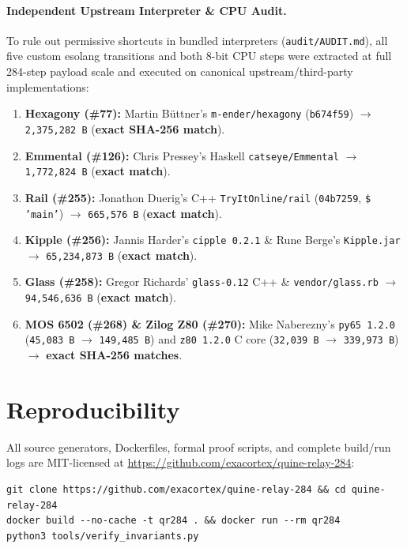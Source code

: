 \documentclass[10pt,twocolumn]{article}
\theoremstyle{definition}
\begin{document}
\paragraph{Independent Upstream Interpreter \& CPU Audit.}
To rule out permissive shortcuts in bundled interpreters (\texttt{audit/AUDIT.md}), all five custom esolang transitions and both 8-bit CPU steps were extracted at full 284-step payload scale and executed on canonical upstream/third-party implementations:
\begin{enumerate}
  \item \textbf{Hexagony (\#77):} Martin B\"uttner's \texttt{m-ender/hexagony} (\texttt{b674f59}) $\to$ \texttt{2,375,282\,B} (\textbf{exact SHA-256 match}).
  \item \textbf{Emmental (\#126):} Chris Pressey's Haskell \texttt{catseye/Emmental} $\to$ \texttt{1,772,824\,B} (\textbf{exact match}).
  \item \textbf{Rail (\#255):} Jonathon Duerig's C++ \texttt{TryItOnline/rail} (\texttt{04b7259}, \texttt{\$ 'main'}) $\to$ \texttt{665,576\,B} (\textbf{exact match}).
  \item \textbf{Kipple (\#256):} Jannis Harder's \texttt{cipple 0.2.1} \& Rune Berge's \texttt{Kipple.jar} $\to$ \texttt{65,234,873\,B} (\textbf{exact match}).
  \item \textbf{Glass (\#258):} Gregor Richards' \texttt{glass-0.12} C++ \& \texttt{vendor/glass.rb} $\to$ \texttt{94,546,636\,B} (\textbf{exact match}).
  \item \textbf{MOS 6502 (\#268) \& Zilog Z80 (\#270):} Mike Naberezny's \texttt{py65 1.2.0} (\texttt{45,083 B} $\to$ \texttt{149,485 B}) and \texttt{z80 1.2.0} C core (\texttt{32,039 B} $\to$ \texttt{339,973 B}) $\to$ \textbf{exact SHA-256 matches}.
\end{enumerate}

\section{Reproducibility}

All source generators, Dockerfiles, formal proof scripts, and complete build/run logs are MIT-licensed at \url{https://github.com/exacortex/quine-relay-284}:
\begin{lstlisting}
git clone https://github.com/exacortex/quine-relay-284 && cd quine-relay-284
docker build --no-cache -t qr284 . && docker run --rm qr284
python3 tools/verify_invariants.py
\end{lstlisting}
\end{document}

